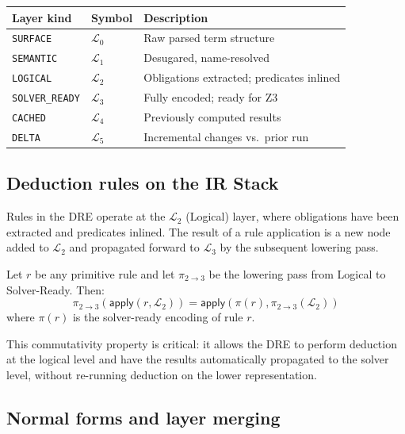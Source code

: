 \documentclass[11pt]{article}
\newcommand{\Apply}{\mathsf{apply}}           %
\newcommand{\Lower}{\pi}                      %
\begin{document}
\begin{center}
\begin{tabular}{lll}
  \toprule
  Layer kind & Symbol & Description \\
  \midrule
  \lstinline|SURFACE|       & $\mathcal{L}_0$ & Raw parsed term structure \\
  \lstinline|SEMANTIC|      & $\mathcal{L}_1$ & Desugared, name-resolved \\
  \lstinline|LOGICAL|       & $\mathcal{L}_2$ & Obligations extracted; predicates inlined \\
  \lstinline|SOLVER_READY|  & $\mathcal{L}_3$ & Fully encoded; ready for Z3 \\
  \lstinline|CACHED|        & $\mathcal{L}_4$ & Previously computed results \\
  \lstinline|DELTA|         & $\mathcal{L}_5$ & Incremental changes vs.\ prior run \\
  \bottomrule
\end{tabular}
\end{center}

\subsection{Deduction rules on the IR Stack}

Rules in the \textsc{DRE} operate at the $\mathcal{L}_2$ (Logical)
layer, where obligations have been extracted and predicates inlined.
The result of a rule application is a new node added to $\mathcal{L}_2$
and propagated forward to $\mathcal{L}_3$ by the subsequent lowering
pass.

\begin{proposition}\label{prop:lower-commute}
  Let $r$ be any primitive rule and let $\Lower_{2 \to 3}$ be the
  lowering pass from Logical to Solver-Ready.  Then:
  \[
    \Lower_{2 \to 3}(\Apply(r, \mathcal{L}_2)) =
    \Apply(\Lower(r), \Lower_{2 \to 3}(\mathcal{L}_2))
  \]
  where $\Lower(r)$ is the solver-ready encoding of rule $r$.
\end{proposition}

This commutativity property is critical: it allows the \textsc{DRE} to
perform deduction at the logical level and have the results
automatically propagated to the solver level, without re-running
deduction on the lower representation.

\subsection{Normal forms and layer merging}
\end{document}

